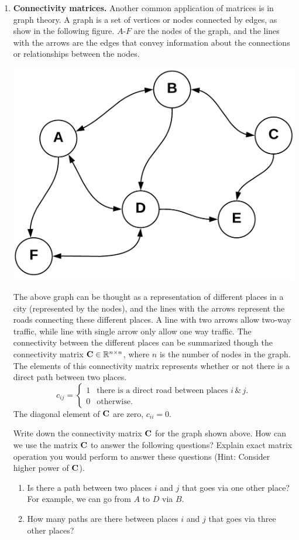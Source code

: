 \documentclass[12pt]{article}
\def\mf{\ensuremath\mathbf}
\def\mb{\ensuremath\mathbb}
\begin{document}
\begin{enumerate}
\item \textbf{Connectivity matrices.} Another common application of matrices is in graph theory. A graph is a set of vertices or nodes connected by edges, as show in the following figure. $A$-$F$ are the nodes of the graph, and the lines with the arrows are the edges that convey information about the connections or relationships between the nodes.
\begin{center}
    \includegraphics[width=0.5\columnwidth]{../figs/graph.png}
\end{center}
The above graph can be thought as a representation of different places in a city (represented by the nodes), and the lines with the arrows represent the roads connecting these different places. A line with two arrows allow two-way traffic, while line with single arrow only allow one way traffic. The connectivity between the different places can be summarized though the connectivity matrix $\mf{C} \in \mb{R}^{n \times n}$, where $n$ is the number of nodes in the graph. The elements of this connectivity matrix  represents whether or not there is a direct path between two places.
\[ 
c_{ij} = \begin{cases}
    1 & \text{there is a direct road between places } i \, \& \,j. \\
    0 & \text{otherwise.}
\end{cases}
\]
The diagonal element of $\mf{C}$ are zero, $c_{ii} = 0$.

Write down the connectivity matrix $\mf{C}$ for the graph shown above. How can we use the matrix $\mf{C}$ to answer the following questions? Explain exact matrix operation you would perform to answer these questions (Hint: Consider higher power of $\mf{C}$).
\begin{enumerate}
    \item Is there a path between two places $i$ and $j$ that goes via one other place? For example, we can go from $A$ to $D$ via $B$.
    \item How many paths are there between places $i$ and $j$ that goes via three other places?
\end{enumerate}

\end{enumerate}
\end{document}
